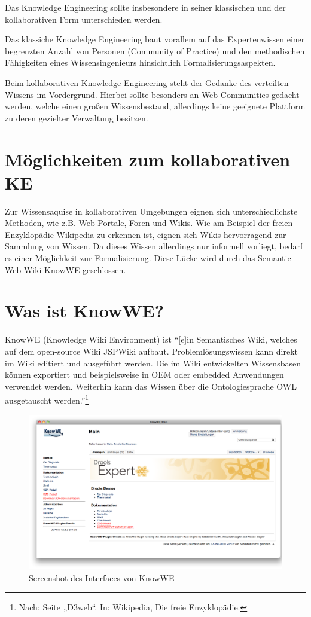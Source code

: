 \documentclass[a4paper,12pt]{report}
\begin{document}
Das Knowledge Engineering sollte insbesondere in seiner klassischen und der kollaborativen Form
unterschieden werden. 

Das klassiche Knowledge Engineering baut vorallem auf das Expertenwissen einer begrenzten
Anzahl von Personen (Community of Practice) und den methodischen Fähigkeiten eines 
Wissensingenieurs hinsichtlich Formalisierungsaspekten. 

Beim kollaborativen Knowledge Engineering steht der Gedanke des verteilten Wissens im Vordergrund.
Hierbei sollte besonders an Web-Communities gedacht werden, welche einen großen Wissensbestand, 
allerdings keine geeignete Plattform zu deren gezielter Verwaltung besitzen.


  \section{Möglichkeiten zum kollaborativen KE}

Zur Wissensaquise in kollaborativen Umgebungen eignen sich unterschiedlichste Methoden, wie z.B.
Web-Portale, Foren und Wikis. Wie am Beispiel der freien Enzyklopädie Wikipedia zu erkennen ist,
eignen sich Wikis hervorragend zur Sammlung von Wissen. Da dieses Wissen allerdings nur informell
vorliegt, bedarf es einer Möglichkeit zur Formalisierung. Diese Lücke wird durch das Semantic Web Wiki
KnowWE geschlossen.
  
  \section{Was ist KnowWE?}

KnowWE (Knowledge Wiki Environment) ist "`[e]in Semantisches Wiki, welches auf dem open-source Wiki JSPWiki 
aufbaut. Problemlösungswissen kann direkt im Wiki editiert und ausgeführt werden. Die im Wiki entwickelten 
Wissensbasen können exportiert und beispielsweise in OEM oder embedded Anwendungen verwendet werden. Weiterhin 
kann das Wissen über die Ontologiesprache OWL ausgetauscht werden."'\footnote{Nach: Seite „D3web“. In: Wikipedia, Die freie Enzyklopädie.}

\begin{figure}[htbp]
  \centering
    \includegraphics[width=\textwidth]{img/knowwe.png}
  \caption{Screenshot des Interfaces von KnowWE}
\end{figure}
\end{document}
